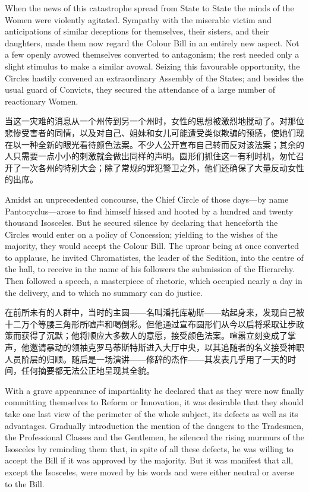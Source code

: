 \documentclass[12pt,UTF8]{ctexbook}
\begin{document}
When the news of this catastrophe spread from State to State the minds of the Women were violently agitated. Sympathy with the miserable victim and anticipations of similar deceptions for themselves, their sisters, and their daughters, made them now regard the Colour Bill in an entirely new aspect. Not a few openly avowed themselves converted to antagonism; the rest needed only a slight stimulus to make a similar avowal. Seizing this favourable opportunity, the Circles hastily convened an extraordinary Assembly of the States; and besides the usual guard of Convicts, they secured the attendance of a large number of reactionary Women.

当这一灾难的消息从一个州传到另一个州时，女性的思想被激烈地搅动了。对那位悲惨受害者的同情，以及对自己、姐妹和女儿可能遭受类似欺骗的预感，使她们现在以一种全新的眼光看待颜色法案。不少人公开宣布自己转而反对该法案；其余的人只需要一点小小的刺激就会做出同样的声明。圆形们抓住这一有利时机，匆忙召开了一次各州的特别大会；除了常规的罪犯警卫之外，他们还确保了大量反动女性的出席。

Amidst an unprecedented concourse, the Chief Circle of those days---by name Pantocyclus---arose to find himself hissed and hooted by a hundred and twenty thousand Isosceles. But he secured silence by declaring that henceforth the Circles would enter on a policy of Concession; yielding to the wishes of the majority, they would accept the Colour Bill. The uproar being at once converted to applause, he invited Chromatistes, the leader of the Sedition, into the centre of the hall, to receive in the name of his followers the submission of the Hierarchy. Then followed a speech, a masterpiece of rhetoric, which occupied nearly a day in the delivery, and to which no summary can do justice.

在前所未有的人群中，当时的主圆——名叫潘托库勒斯——站起身来，发现自己被十二万个等腰三角形所嘘声和喝倒彩。但他通过宣布圆形们从今以后将采取让步政策而获得了沉默；他将顺应大多数人的意愿，接受颜色法案。喧嚣立刻变成了掌声，他邀请暴动的领袖克罗马蒂斯特斯进入大厅中央，以其追随者的名义接受神职人员阶层的归顺。随后是一场演讲——修辞的杰作——其发表几乎用了一天的时间，任何摘要都无法公正地呈现其全貌。

With a grave appearance of impartiality he declared that as they were now finally committing themselves to Reform or Innovation, it was desirable that they should take one last view of the perimeter of the whole subject, its defects as well as its advantages. Gradually introduction the mention of the dangers to the Tradesmen, the Professional Classes and the Gentlemen, he silenced the rising murmurs of the Isosceles by reminding them that, in spite of all these defects, he was willing to accept the Bill if it was approved by the majority. But it was manifest that all, except the Isosceles, were moved by his words and were either neutral or averse to the Bill.
\end{document}
